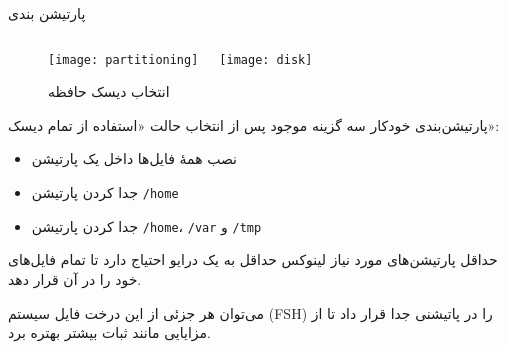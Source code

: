 \begin{frame}{پارتیشن بندی}
  \begin{figure}
    \begin{columns}
      \texttt{[image: partitioning]}
      \caption*{انتخاب روش پارتیشن‌بندی~\cite{fig:deb:partitioning}}
      \texttt{[image: disk]}
      \caption*{انتخاب دیسک حافظه~\cite{fig:deb:disk}}
    \end{columns}
  \end{figure}
\end{frame}

\begin{frame}{پارتیشن‌بندی خودکار}
  سه گزینه موجود پس از انتخاب حالت «استفاده از تمام دیسک»:
  \begin{itemize}
    \item نصب همهٔ فایل‌ها داخل یک پارتیشن
    \item جدا کردن پارتیشن \texttt{/home}
    \item جدا کردن پارتیشن \texttt{/home}، \texttt{/var} و \texttt{/tmp}
  \end{itemize}
\end{frame}
\begin{frame}{حداقل پارتیشن‌های مورد نیاز}
  لینوکس حداقل به یک درایو احتیاج دارد تا تمام فایل‌های خود را در آن قرار دهد.

  می‌توان هر جزئی از این درخت فایل سیستم (FSH) را در پاتیشنی جدا قرار داد تا از مزایایی مانند ثبات بیشتر بهتره برد.
\begin{table}
  \caption*{ساختار پیشنهادی برای بیشتر نصب‌های دستی}
\end{table}
\end{frame}
